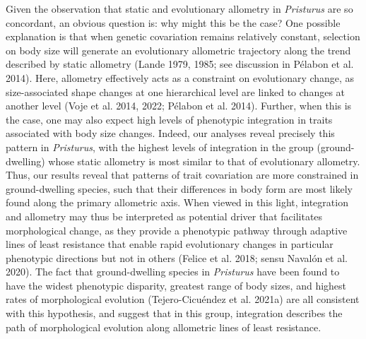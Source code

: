 \documentclass[
  11pt,
]{article}
\begin{document}
Given the observation that static and evolutionary allometry in
\emph{Pristurus} are so concordant, an obvious question is: why might
this be the case? One possible explanation is that when genetic
covariation remains relatively constant, selection on body size will
generate an evolutionary allometric trajectory along the trend described
by static allometry (Lande 1979, 1985; see discussion in Pélabon et al.
2014). Here, allometry effectively acts as a constraint on evolutionary
change, as size-associated shape changes at one hierarchical level are
linked to changes at another level (Voje et al. 2014, 2022; Pélabon et
al. 2014). Further, when this is the case, one may also expect high
levels of phenotypic integration in traits associated with body size
changes. Indeed, our analyses reveal precisely this pattern in
\emph{Pristurus}, with the highest levels of integration in the group
(ground-dwelling) whose static allometry is most similar to that of
evolutionary allometry. Thus, our results reveal that patterns of trait
covariation are more constrained in ground-dwelling species, such that
their differences in body form are most likely found along the primary
allometric axis. When viewed in this light, integration and allometry
may thus be interpreted as potential driver that facilitates
morphological change, as they provide a phenotypic pathway through
adaptive lines of least resistance that enable rapid evolutionary
changes in particular phenotypic directions but not in others (Felice et
al. 2018; sensu Navalón et al. 2020). The fact that ground-dwelling
species in \emph{Pristurus} have been found to have the widest
phenotypic disparity, greatest range of body sizes, and highest rates of
morphological evolution (Tejero-Cicuéndez et al. 2021a) are all
consistent with this hypothesis, and suggest that in this group,
integration describes the path of morphological evolution along
allometric lines of least resistance. \hfill\break
\end{document}
